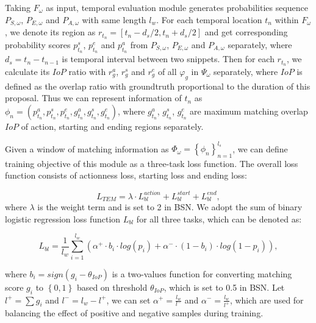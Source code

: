 \documentclass[runningheads]{llncs}
\begin{document}
Taking $F_{\omega}$ as input, temporal evaluation module generates probabilities sequence $P_{S,\omega}$, $P_{E,\omega}$ and $P_{A,\omega}$ with same length $l_w$.
For each temporal location $t_n$ within $F_{\omega}$, we denote its region as $r _{t_n}=[ t_n-d_s/2,t_n+d_s/2 ]$ and get corresponding probability scores $p^s_{t_n}$, $p^e_{t_n}$ and $p^a_{t_n}$ from $P_{S,\omega}$, $P_{E,\omega}$ and $P_{A,\omega}$ separately, where $d_s=t_{n}-t_{n-1}$ is temporal interval between two snippets.
Then for each  $r_{t_n}$, we calculate its $IoP$ ratio with $r_{g}^a$, $r_g^s$ and $r_g^e$ of all $\varphi_g$ in $\Psi_{\omega}$ separately, where $IoP$ is defined as the overlap ratio with groundtruth proportional to the duration of this proposal. Thus we can represent information of $t_n$ as $\phi_{n}=(p^a_{t_n},p^s_{t_n},p^e_{t_n},g^{a}_{t_n},g^{s}_{t_n},g^{e}_{t_n})$, where $g^{a}_{t_n}$, $g^{s}_{t_n}$, $g^{e}_{t_n}$ are maximum matching overlap $IoP$ of action, starting and ending regions separately.

Given a window of matching information as $\Phi_{\omega}=\left \{ \phi_n \right \}_{n=1}^{l_s}$, we can define training objective of this module as a three-task loss function. The overall loss function consists of actionness loss, starting loss and ending loss:


\begin{equation}
L_{TEM}=\lambda \cdot L_{bl}^{action}+L_{bl}^{start}+L_{bl}^{end} ,
\end{equation}
where $\lambda$ is the weight term and is set to 2 in BSN. We adopt the sum of binary logistic regression loss function $L_{bl}$ for all three tasks, which can be denoted as:

\begin{small}
\begin{equation}
L_{bl}=\frac{1}{l_w}\sum_{i=1}^{l_w} \left (\alpha^{+} \cdot b_i \cdot  log(p_i)+\alpha^{-} \cdot (1-b_i) \cdot log(1-p_i) \right ),
\end{equation}
\end{small}
where $b_i=sign(g_i-\theta_{IoP})$ is a two-values function for converting matching score $g_i$ to $\left \{0,1  \right \}$ based on threshold $\theta_{IoP}$, which is set to 0.5 in BSN.  Let $l^+=\sum g_i$ and $l^-=l_w-l^+$, we can set $\alpha^+=\frac{l_w}{l^-}$ and $\alpha^-=\frac{l_w}{l^+}$, which are used for balancing the effect of positive and negative samples during training.
\end{document}
